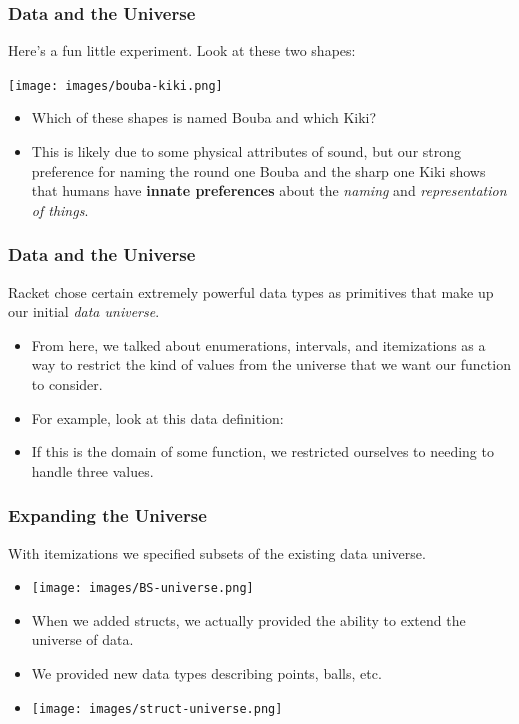 \documentclass{beamer}
\begin{document}
\begin{frame}
  \frametitle{Data and the Universe}
  Here's a fun little experiment. Look at these two shapes:
  \begin{center}
    \texttt{[image: images/bouba-kiki.png]}
  \end{center}
  \begin{itemize}
  \item<2-> Which of these shapes is named Bouba and which Kiki?
  \item<3-> This is likely due to some physical attributes of sound, but
    our strong preference for naming the round one Bouba and the
    sharp one Kiki shows that humans have \textbf{innate preferences}
    about the \emph{naming} and \emph{representation of things}.
  \end{itemize}
\end{frame}


\begin{frame}
  \frametitle{Data and the Universe}
  Racket chose certain extremely powerful data types as primitives
  that make up our initial \emph{data universe}.
  \begin{itemize}
  \item<2-> From here, we talked about enumerations, intervals,
    and itemizations as a way to restrict the kind of values from
    the universe that we want our function to consider.
  \item<3-> For example, look at this data definition:
    \BSData
  \item<4-> If this is the domain of some function, we restricted
    ourselves to needing to handle three values.  
  \end{itemize}
\end{frame}

\begin{frame}
  \frametitle{Expanding the Universe}
With itemizations we specified subsets of the existing data universe.
\begin{itemize}
  \item<1-> \texttt{[image: images/BS-universe.png]}    
  \item<2-> When we added structs, we actually provided the ability to
  extend the universe of data.
  \item<3-> We provided new data types describing points, balls, etc.
  \item<4-> \texttt{[image: images/struct-universe.png]}
  \end{itemize}
\end{frame}
\end{document}
